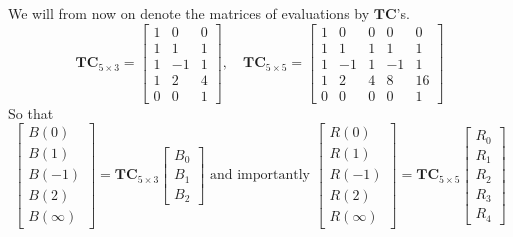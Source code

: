 \documentclass[
11pt,notheorems,hyperref={pdfauthor=whatever}
]{beamer}
\begin{document}
\begin{frame}
    We will from now on denote the matrices of evaluations by $\mathbf{TC}$'s.
    \[
    \mathbf{TC}_{5\times 3}=\left[\begin{array}{ccc}
    1 & 0 & 0 \\
    1 & 1 & 1 \\
    1 & -1 & 1 \\
    1 & 2 & 4 \\
    0 & 0 & 1
    \end{array}\right], \quad \mathbf{TC}_{5 \times 5}=\left[\begin{array}{ccccc}
    1 & 0 & 0 & 0 & 0 \\
    1 & 1 & 1 & 1 & 1 \\
    1 & -1 & 1 & -1 & 1 \\
    1 & 2 & 4 & 8 & 16 \\
    0 & 0 & 0 & 0 & 1
    \end{array}\right]
    \]
    So that 
    \[
    \left[\begin{array}{l}
    B(0) \\
    B(1) \\
    B(-1) \\
    B(2) \\
    B(\infty)
    \end{array}\right]=\mathbf{TC}_{5\times 3}\left[\begin{array}{l}
    B_0 \\
    B_1 \\
    B_2
    \end{array}\right]\text{ and importantly }
    \left[\begin{array}{l}
        R(0) \\
        R(1) \\
        R(-1) \\
        R(2) \\
        R(\infty)
        \end{array}\right] = \mathbf{TC}_{5\times 5}
    \left[\begin{array}{l}
        R_0 \\
        R_1 \\
        R_2 \\
        R_3 \\
        R_4
        \end{array}\right]
    \]
\end{frame}
\end{document}
